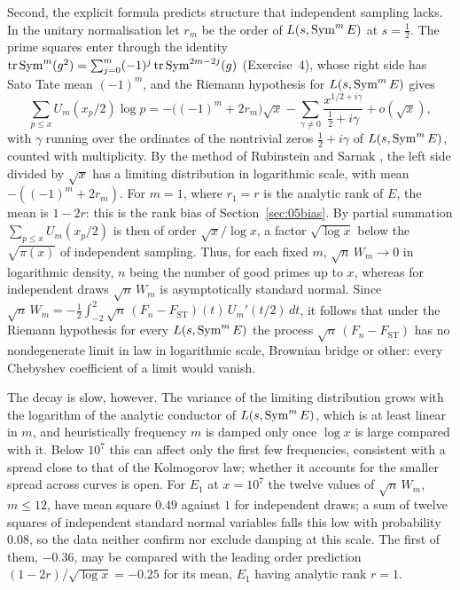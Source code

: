 Second, the explicit formula predicts structure that independent sampling lacks. In the unitary normalisation let $r_m$ be the order of $L(s,\operatorname{Sym}^mE)$ at $s = \frac12$. The prime squares enter through the identity $\operatorname{tr}\operatorname{Sym}^m(g^2) = \sum_{j=0}^m(-1)^j\operatorname{tr}\operatorname{Sym}^{2m-2j}(g)$ (Exercise~4), whose right side has Sato Tate mean $(-1)^m$, and the Riemann hypothesis for $L(s,\operatorname{Sym}^mE)$ gives
\[
\sum_{p\le x}U_m(x_p/2)\log p = -\bigl((-1)^m + 2r_m\bigr)\sqrt x - \sum_{\gamma\ne0}\frac{x^{1/2+i\gamma}}{\frac12+i\gamma} + o(\sqrt x),
\]
with $\gamma$ running over the ordinates of the nontrivial zeros $\frac12+i\gamma$ of $L(s,\operatorname{Sym}^mE)$, counted with multiplicity. By the method of Rubinstein and Sarnak \cite{rubinsteinsarnak1994}, the left side divided by $\sqrt x$ has a limiting distribution in logarithmic scale, with mean $-((-1)^m + 2r_m)$. For $m = 1$, where $r_1 = r$ is the analytic rank of $E$, the mean is $1 - 2r$: this is the rank bias of Section~\ref{sec:05bias}. By partial summation $\sum_{p\le x}U_m(x_p/2)$ is then of order $\sqrt x/\log x$, a factor $\sqrt{\log x}$ below the $\sqrt{\pi(x)}$ of independent sampling. Thus, for each fixed $m$, $\sqrt n\,W_m\to0$ in logarithmic density, $n$ being the number of good primes up to $x$, whereas for independent draws $\sqrt n\,W_m$ is asymptotically standard normal. Since $\sqrt n\,W_m = -\frac12\int_{-2}^2\sqrt n\,(F_n - F_{\mathrm{ST}})(t)\,U_m'(t/2)\,dt$, it follows that under the Riemann hypothesis for every $L(s,\operatorname{Sym}^mE)$ the process $\sqrt n\,(F_n - F_{\mathrm{ST}})$ has no nondegenerate limit in law in logarithmic scale, Brownian bridge or other: every Chebyshev coefficient of a limit would vanish.

The decay is slow, however. The variance of the limiting distribution grows with the logarithm of the analytic conductor of $L(s,\operatorname{Sym}^mE)$, which is at least linear in $m$, and heuristically frequency $m$ is damped only once $\log x$ is large compared with it. Below $10^7$ this can affect only the first few frequencies, consistent with a spread close to that of the Kolmogorov law; whether it accounts for the smaller spread across curves is open. For $E_1$ at $x = 10^7$ the twelve values of $\sqrt n\,W_m$, $m\le12$, have mean square $0.49$ against $1$ for independent draws; a sum of twelve squares of independent standard normal variables falls this low with probability $0.08$, so the data neither confirm nor exclude damping at this scale. The first of them, $-0.36$, may be compared with the leading order prediction $(1-2r)/\sqrt{\log x} = -0.25$ for its mean, $E_1$ having analytic rank $r=1$.

